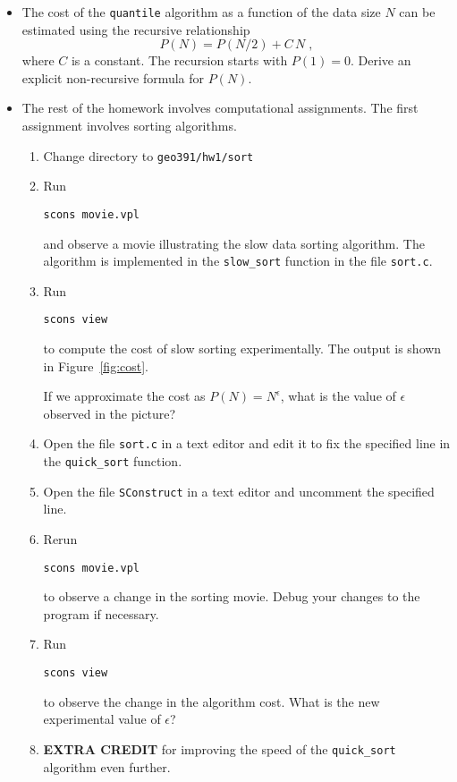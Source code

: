 \begin{itemize}
\item The cost of the \texttt{quantile} algorithm as 
a function of the data size $N$ can be estimated using 
the recursive relationship
\begin{equation}
\label{eq:cost}
P(N)=P(N/2)+C\,N\;,
\end{equation}
where $C$ is a constant. The recursion starts with $P(1)=0$. Derive an
explicit non-recursive formula for $P(N)$.
\item The rest of the homework involves computational assignments. 
      The first assignment involves sorting algorithms.

\lstset{language=c,numbers=left,numberstyle=\tiny,showstringspaces=false}


\newpage

\begin{enumerate}          
\item Change directory to \verb#geo391/hw1/sort#
\item Run
\begin{verbatim}
scons movie.vpl
\end{verbatim}
and observe a movie illustrating the slow data sorting algorithm. The
algorithm is implemented in the \texttt{slow\_sort} function in the
file \texttt{sort.c}.

\item Run
\begin{verbatim}
scons view
\end{verbatim}
to compute the cost of slow sorting experimentally. The output is
shown in Figure~\ref{fig:cost}.


If we approximate the cost as $P(N)=N^\epsilon$, what is the value of
$\epsilon$ observed in the picture?

\item Open the file \texttt{sort.c} in a text editor and edit it to 
fix the specified line in the \texttt{quick\_sort} function.

\item Open the file \texttt{SConstruct} in a text editor and uncomment 
      the specified line.

\item Rerun
\begin{verbatim}
scons movie.vpl
\end{verbatim}
to observe a change in the sorting movie. Debug your changes to the
program if necessary.

\item Run
\begin{verbatim}
scons view
\end{verbatim}
to observe the change in the algorithm cost. What is the new
experimental value of $\epsilon$?

\item \textbf{EXTRA CREDIT} for improving the speed of the 
\texttt{quick\_sort} algorithm even further.
\end{enumerate}
\end{itemize}   

